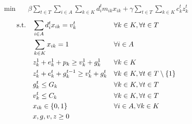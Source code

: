\begin{align}
    \min\quad       & \beta \sum_{t \in T} \sum_{i \in A} \sum_{k \in K}{d^t_i m_{ik} x_{ik}} + \gamma \sum_{t \in T} \sum_{k \in K}{c_k^t z_k^t}
    \label{eq:migrinf-obj}
\end{align}
\vspace*{-10mm}
\begin{align}
    \text{s.t.\quad}
    \label{eq:migrinf-c1}
    & \sum_{i \in A}{d^t_i x_{ik}} = v_k^t          &   & \forall k \in K, \forall t \in T                 \\
    \label{eq:migrinf-c2}
    & \sum_{k \in K}{x_{ik}} = 1                    &   & \forall i \in A                                  \\
    \label{eq:migrinf-c3}
    & z_k^1 + e_k^1 + p_k \geq v_k^1 + g_k^1        &   & \forall k \in K                                  \\
    \label{eq:migrinf-c4}
    & z_k^t + e_k^t + g_k^{t-1} \geq v_k^t + g_k^t  &   & \forall k \in K, \forall t \in T \setminus \{1\} \\
    \label{eq:migrinf-c5}
    & g_k^t \leq G_k                                &   & \forall k \in K, \forall t \in T                 \\
    \label{eq:migrinf-c6}
    & v_k^t \leq C_k                                &   & \forall k \in K, \forall t \in T                 \\
    \label{eq:migrinf-c7}
    & x_{ik} \in \{0,1\}                            &   & \forall i \in A, \forall k \in K                 \\
    \label{eq:migrinf-c8}
    & x, g, v, z \geq 0                             &   &
\end{align}
